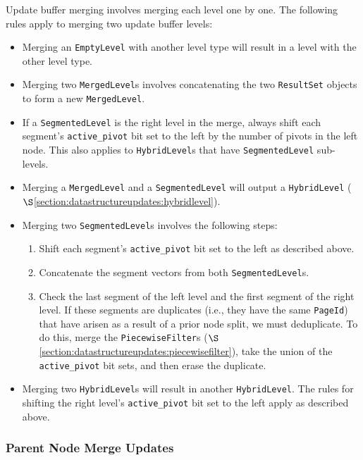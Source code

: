 \documentclass[11pt]{article}
\begin{document}
Update buffer merging involves merging each level one by one. The following rules apply to merging two update buffer levels:
\begin{itemize}
    \item Merging an \texttt{EmptyLevel} with another level type will result in a level with the other level type.
    \item Merging two \texttt{MergedLevel}s involves concatenating the two \texttt{ResultSet} objects to form a new \texttt{MergedLevel}.
    \item If a \texttt{SegmentedLevel} is the right level in the merge, always shift each segment's \texttt{active\_pivot} bit set to the left by the number of pivots in the left node. This also applies to \texttt{HybridLevel}s that have \texttt{SegmentedLevel} sub-levels.
    \item Merging a \texttt{MergedLevel} and a \texttt{SegmentedLevel} will output a \texttt{HybridLevel} ($\S$\ref{section:datastructureupdates:hybridlevel}).
    \item Merging two \texttt{SegmentedLevel}s involves the following steps:
    \begin{enumerate}
        \item Shift each segment's \texttt{active\_pivot} bit set to the left as described above.
        \item Concatenate the segment vectors from both \texttt{SegmentedLevel}s.
        \item Check the last segment of the left level and the first segment of the right level. If these segments are duplicates (i.e., they have the same \texttt{PageId}) that have arisen as a result of a prior node split, we must deduplicate. To do this, merge the \texttt{PiecewiseFilter}s ($\S$\ref{section:datastructureupdates:piecewisefilter}), take the union of the \texttt{active\_pivot} bit sets, and then erase the duplicate.
    \end{enumerate}
    \item Merging two \texttt{HybridLevel}s will result in another \texttt{HybridLevel}. The rules for shifting the right level's \texttt{active\_pivot} bit set to the left apply as described above.
\end{itemize}

\subsubsection{Parent Node Merge Updates}\label{section:newturtletreealogs:parentnodemerge}
\end{document}
